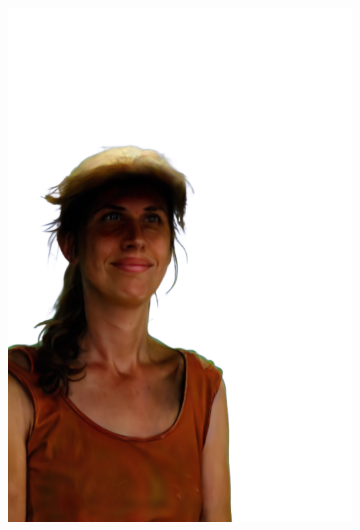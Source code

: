 \begin{figure}[ht]
\begin{subfigure}{0.08\linewidth}
        \includegraphics[width=\textwidth]{Figures/results/high/dora_cowboy/11_render.png}

\end{subfigure}
\end{figure}
